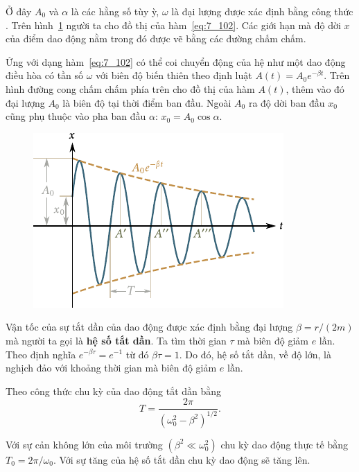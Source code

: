 \noindent
Ở đây $A_0$ và $\alpha$ là các hằng số tùy ỳ, $\omega$ là đại lượng được xác định bằng công thức . Trên hình~\ref{fig:7_19} người ta cho đồ thị của hàm~\eqref{eq:7_102}. Các giới hạn mà độ dời $x$ của điểm dao động nằm trong đó được vẽ bằng các đường chấm chấm.

Ứng với dạng hàm~\eqref{eq:7_102} có thể coi chuyển động của hệ như một dao động điều hòa có tần số $\omega$ với biên độ biến thiên theo định luật $A(t)=A_0e^{-\beta t}$. Trên hình  đường cong chấm chấm phía trên cho đồ thị của hàm $A(t)$, thêm vào đó đại lượng $A_0$ là biên độ tại thời điểm ban đầu. Ngoài $A_0$ ra độ dời ban đầu $x_0$ cũng phụ thuộc vào pha ban đầu $\alpha$: $x_0=A_0\cos\alpha$.

\begin{figure}[!htb]
	\begin{center}
		\includegraphics[scale=1.0]{figures/ch_07/fig_7_19.pdf}
		\caption[]{}
		\label{fig:7_19}
	\end{center}
\end{figure}

Vận tốc của sự tắt dần của dao động được xác định bằng đại lượng $\beta=r/(2m)$ mà người ta gọi là \textbf{hệ số tắt dần}. Ta tìm thời gian $\tau$ mà biên độ giảm $e$ lần. Theo định nghĩa $e^{-\beta\tau}=e^{-1}$ từ đó $\beta\tau=1$. Do đó, hệ số tắt dần, về độ lớn, là nghịch đảo với khoảng thời gian mà biên độ giảm $e$ lần.

Theo công thức  chu kỳ của dao động tắt dần bằng
\begin{equation}\label{eq:7_103}
	T = \frac{2\pi}{\left(\omega_0^2 - \beta^2\right)^{1/2}}.
\end{equation}

\noindent
Với sự cản không lớn của môi trường $(\beta^2 \ll \omega_0^2)$ chu kỳ dao động thực tế bằng $T_0=2\pi/\omega_0$. Với sự tăng của hệ số tắt dần chu kỳ dao động sẽ tăng lên.

